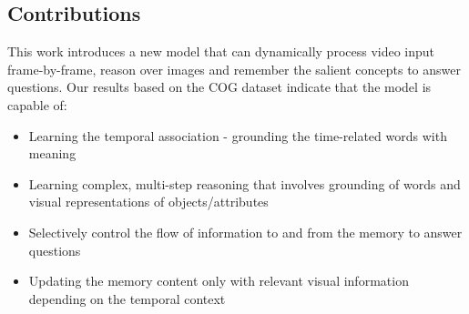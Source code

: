 \subsection{Contributions}
This work introduces a new model that can dynamically process video input frame-by-frame, reason over images and remember the salient concepts to answer questions.  Our results based on the COG dataset \cite{yang2018dataset} indicate that the model is capable of:
\begin{itemize}
\item Learning the temporal association - grounding the time-related words with meaning

\item Learning complex, multi-step reasoning that involves grounding of words and visual representations of objects/attributes
\item Selectively control the flow of information to and from the memory to answer questions
\item Updating the memory content only with relevant visual information depending on the temporal context

\end{itemize}







